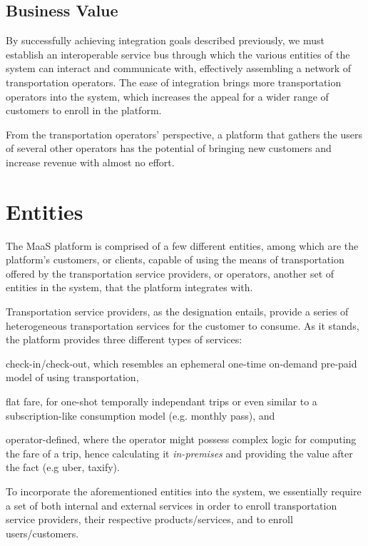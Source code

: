 \documentclass[runningheads,a4]{llncs}
\begin{document}
\subsection{Business Value}
\label{sec:business.value}
By successfully achieving integration goals described previously, we must
establish an interoperable service bus through which the various entities of the
system can interact and communicate with, effectively assembling a network of
transportation operators. The ease of integration brings more transportation
operators into the system, which increases the appeal for a wider range of
customers to enroll in the platform.

From the transportation operators' perspective, a platform that gathers the
users of several other operators has the potential of bringing new customers and
increase revenue with almost no effort.


\section{Entities}
\label{sec:entities}
The MaaS platform is comprised of a few different entities, among which are the
platform’s customers, or clients, capable of using the means of transportation
offered by the transportation service providers, or operators, another set of
entities in the system, that the platform integrates with.

Transportation service providers, as the designation entails, provide a series
of heterogeneous transportation services for the customer to consume. As it
stands, the platform provides three different types of services:
\begin{enumerate*}[label=(\arabic*)]
  \item check-in/check-out, which resembles an ephemeral one-time on-demand
        pre-paid model of using transportation,
  \item flat fare, for one-shot temporally independant trips or even similar to
        a subscription-like consumption model (e.g. monthly pass), and
  \item operator-defined, where the operator might possess complex logic for
        computing the fare of a trip, hence calculating it \emph{in-premises}
        and providing the value after the fact (e.g uber, taxify).
\end{enumerate*}

To incorporate the aforementioned entities into the system, we essentially
require a set of both internal and external services in order to enroll
transportation service providers, their respective products/services, and to
enroll users/customers.
\end{document}
